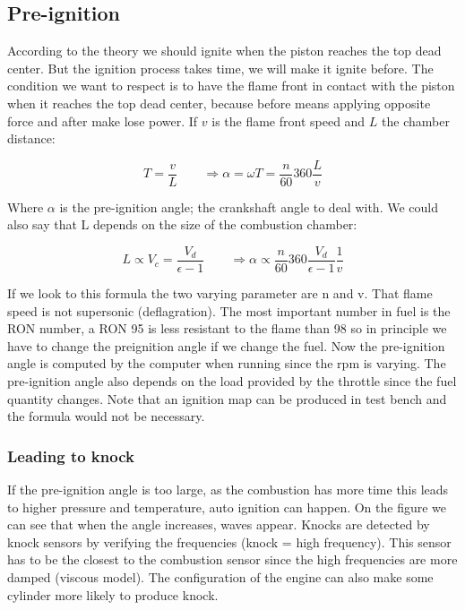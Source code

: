 \subsection{Pre-ignition}
	According to the theory we should ignite when the piston reaches the top dead center. But the ignition process takes time, we will make it ignite before. The condition we want to respect is to have the flame front in contact with the piston when it reaches the top dead center, because before means applying opposite force and after make lose power. If $v$ is the flame front speed and $L$ the chamber distance: 
	
	\begin{equation}
	T = \frac{v}{L} \qquad \Rightarrow \alpha = \omega T = \frac{n}{60}360\frac{L}{v}
	\end{equation}

Where $\alpha$ is the pre-ignition angle; the crankshaft angle to deal with. We could also say that L depends on the size of the combustion chamber: 

\begin{equation}
L \propto V_c = \frac{V_d }{\epsilon -1 } \qquad \Rightarrow \alpha \propto \frac{n}{60}360\frac{V_d }{\epsilon -1 }\frac{1}{v}
\end{equation}

If we look to this formula the two varying parameter are n and v. That flame speed is not supersonic (deflagration). The most important number in fuel is the RON number, a RON 95 is less resistant to the flame than 98 so in principle we have to change the preignition angle if we change the fuel. Now the pre-ignition angle is computed by the computer when running since the rpm is varying. The pre-ignition angle also depends on the load provided by the throttle since the fuel quantity changes. Note that an ignition map can be produced in test bench and the formula would not be necessary. 

\subsubsection{Leading to knock}
	If the pre-ignition angle is too large, as the combustion has more time this leads to higher pressure and temperature, auto ignition can happen. On the figure we can see that when the angle increases, waves appear. Knocks are detected by knock sensors by verifying the frequencies (knock = high frequency). This sensor has to be the closest to the combustion sensor since the high frequencies are more damped (viscous model). The configuration of the engine can also make some cylinder more likely to produce knock. 
	
